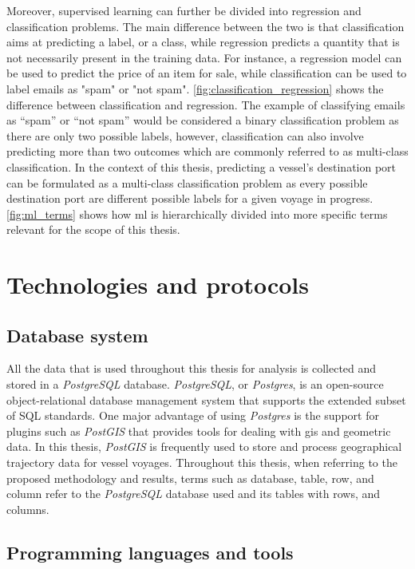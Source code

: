 Moreover, supervised learning can further be divided into regression and classification problems. The main difference between the two is that classification aims at predicting a label, or a class, while regression predicts a quantity that is not necessarily present in the training data. For instance, a regression model can be used to predict the price of an item for sale, while classification can be used to label emails as "spam" or "not spam". \cref{fig:classification_regression} shows the difference between classification and regression. The example of classifying emails as ``spam'' or ``not spam'' would be considered a binary classification problem as there are only two possible labels, however, classification can also involve predicting more than two outcomes which are commonly referred to as multi-class classification. In the context of this thesis, predicting a vessel's destination port can be formulated as a multi-class classification problem as every possible destination port are different possible labels for a given voyage in progress. \cref{fig:ml_terms} shows how \acrshort{ml} is hierarchically divided into more specific terms relevant for the scope of this thesis.


\section{Technologies and protocols}

\subsection{Database system}

All the data that is used throughout this thesis for analysis is collected and stored in a \textit{PostgreSQL} database. \textit{PostgreSQL}, or \textit{Postgres}, is an open-source object-relational database management system that supports the extended subset of SQL standards. One major advantage of using \textit{Postgres} is the support for plugins such as \textit{PostGIS} that provides tools for dealing with \acrshort{gis} and geometric data. In this thesis, \textit{PostGIS} is frequently used to store and process geographical trajectory data for vessel voyages. Throughout this thesis, when referring to the proposed methodology and results, terms such as database, table, row, and column refer to the \textit{PostgreSQL} database used and its tables with rows, and columns.

\subsection{Programming languages and tools}

